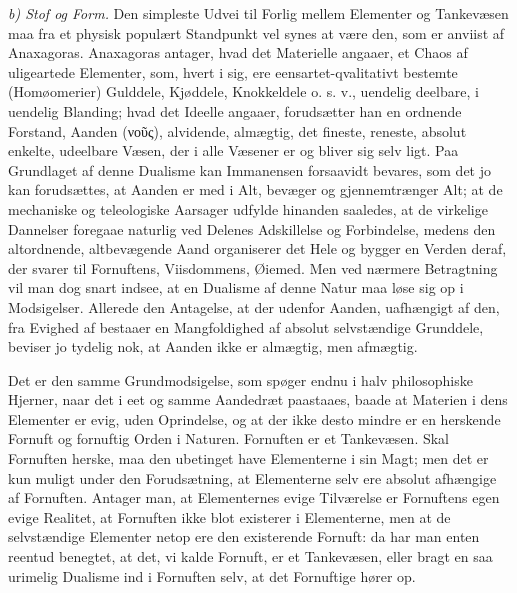 \documentclass[12pt,a4paper]{book}
\newcommand{\runin}[1]{\emph{#1}\hspace{0.4em}}
\begin{document}
\runin{b) Stof og Form.} Den simpleste Udvei til Forlig mellem Elementer og
Tankevæsen maa fra et physisk populært Standpunkt vel synes at være den, som
er anviist af Anaxagoras. Anaxagoras antager, hvad det Materielle angaaer, et
Chaos af uligeartede Elementer, som, hvert i sig, ere eensartet-qvalitativt
bestemte (Homøomerier) Gulddele, Kjøddele, Knokkeldele o. s. v., uendelig
deelbare, i uendelig Blanding; hvad det Ideelle angaaer, forudsætter han en
ordnende Forstand, Aanden (νοῦς), alvidende, almægtig, det fineste, reneste,
absolut enkelte, udeelbare Væsen, der i alle Væsener er og bliver sig selv
ligt. Paa Grundlaget af denne Dualisme kan Immanensen forsaavidt bevares, som
det jo kan forudsættes, at Aanden er med i Alt, bevæger og gjennemtrænger Alt;
at de mechaniske og teleologiske Aarsager udfylde hinanden saaledes, at de
virkelige Dannelser foregaae naturlig ved Delenes Adskillelse og Forbindelse,
medens den altordnende, altbevægende Aand organiserer det Hele og bygger en
Verden deraf, der svarer til Fornuftens, Viisdommens, Øiemed. Men ved nærmere
Betragtning vil man dog snart indsee, at en Dualisme af denne Natur maa løse
sig op i Modsigelser. Allerede den Antagelse, at der udenfor Aanden,
uafhængigt af den, fra Evighed af bestaaer en Mangfoldighed af absolut
selvstændige Grunddele, beviser jo tydelig nok, at Aanden ikke er almægtig,
men afmægtig.

Det er den samme Grundmodsigelse, som spøger endnu i halv philosophiske
Hjerner, naar det i eet og samme Aandedræt paastaaes, baade at Materien i dens
Elementer er evig, uden Oprindelse, og at der ikke desto mindre er en
herskende Fornuft og fornuftig Orden i Naturen. Fornuften er et Tankevæsen.
Skal Fornuften herske, maa den ubetinget have Elementerne i sin Magt; men det
er kun muligt under den Forudsætning, at Elementerne selv ere absolut
afhængige af Fornuften. Antager man, at Elementernes evige Tilværelse er
Fornuftens egen evige Realitet, at Fornuften ikke blot existerer i
Elementerne, men at de selvstændige Elementer netop ere den existerende
Fornuft: da har man enten reentud benegtet, at det, vi kalde Fornuft, er et
Tankevæsen, eller bragt en saa urimelig Dualisme ind i Fornuften selv, at det
Fornuftige hører op.
\end{document}
